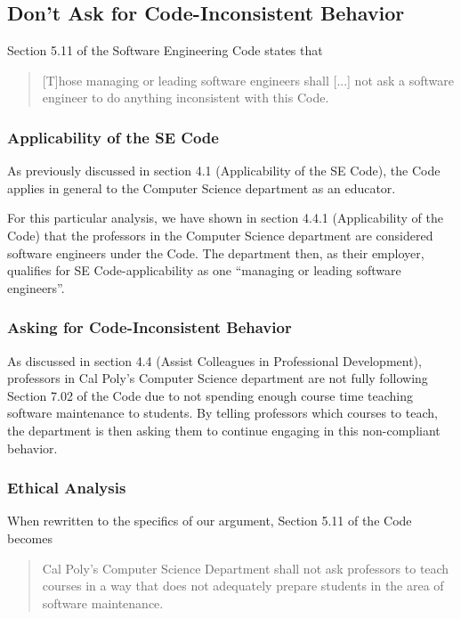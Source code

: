 \documentclass[11pt]{article}
\begin{document}
\begin{multicols}{2}
\subsection{Don't Ask for Code-Inconsistent Behavior}

Section 5.11 of the Software Engineering Code states that

\begin{quote}
[T]hose managing or leading software engineers shall [...] not ask a software engineer to do anything inconsistent with this Code. \cite{secode}
\end{quote}

\subsubsection{Applicability of the SE Code}

As previously discussed in section 4.1 (Applicability of the SE Code), the Code applies in general to the Computer Science department as an educator.

For this particular analysis, we have shown in section 4.4.1 (Applicability of the Code) that the professors in the Computer Science department are considered software engineers under the Code.  The department then, as their employer, qualifies for SE Code-applicability as one ``managing or leading software engineers''. \cite{secode}

\subsubsection{Asking for Code-Inconsistent Behavior}

As discussed in section 4.4 (Assist Colleagues in Professional Development), professors in Cal Poly's Computer Science department are not fully following Section 7.02 of the Code due to not spending enough course time teaching software maintenance to students.  By telling professors which courses to teach, the department is then asking them to continue engaging in this non-compliant behavior.

\subsubsection{Ethical Analysis}

When rewritten to the specifics of our argument, Section 5.11 of the Code becomes

\begin{quote}
Cal Poly's Computer Science Department shall not ask professors to teach courses in a way that does not adequately prepare students in the area of software maintenance.
\end{quote}


\end{multicols}
\end{document}

